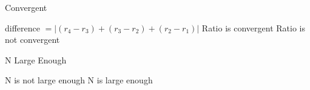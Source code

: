   \begin{algorithm}[t]
    \caption{Convergent}
    \begin{algorithmic}
      \STATE difference $= |(r_4 - r_3) + (r_3 -r_2) + (r_2 - r_1)|$
      \RETURN Ratio is convergent
      \ELSE
      \RETURN Ratio is not convergent
      \ENDIF
    \end{algorithmic}
    \label{alg:convergence}
  \end{algorithm}

  \begin{algorithm}[t]
    \caption{N Large Enough}
    \begin{algorithmic}
      \RETURN N is not large enough
      \ENDIF
      \ENDIF
      \RETURN N is large enough
    \end{algorithmic}
    \label{alg:tuning}
  \end{algorithm}
